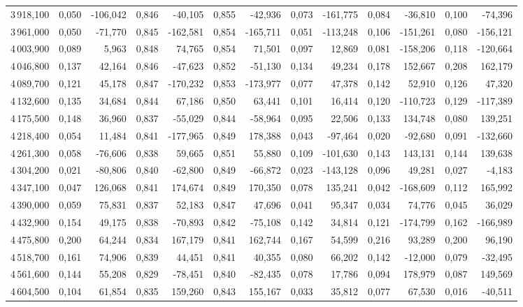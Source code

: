 \begin{longtable}{rrrrrrrrrrrrr}
3\,918,100 & 0,050 & -106,042 & 0,846 & -40,105 & 0,855 & -42,936 & 0,073 & -161,775 & 0,084 & -36,810 & 0,100 & -74,396\\
3\,961,000 & 0,050 & -71,770 & 0,845 & -162,581 & 0,854 & -165,711 & 0,051 & -113,248 & 0,106 & -151,261 & 0,080 & -156,121\\
4\,003,900 & 0,089 & 5,963 & 0,848 & 74,765 & 0,854 & 71,501 & 0,097 & 12,869 & 0,081 & -158,206 & 0,118 & -120,664\\
4\,046,800 & 0,137 & 42,164 & 0,846 & -47,623 & 0,852 & -51,130 & 0,134 & 49,234 & 0,178 & 152,667 & 0,208 & 162,179\\
4\,089,700 & 0,121 & 45,178 & 0,847 & -170,232 & 0,853 & -173,977 & 0,077 & 47,378 & 0,142 & 52,910 & 0,126 & 47,320\\
4\,132,600 & 0,135 & 34,684 & 0,844 & 67,186 & 0,850 & 63,441 & 0,101 & 16,414 & 0,120 & -110,723 & 0,129 & -117,389\\
4\,175,500 & 0,148 & 36,960 & 0,837 & -55,029 & 0,844 & -58,964 & 0,095 & 22,506 & 0,133 & 134,748 & 0,080 & 139,251\\
4\,218,400 & 0,054 & 11,484 & 0,841 & -177,965 & 0,849 & 178,388 & 0,043 & -97,464 & 0,020 & -92,680 & 0,091 & -132,660\\
4\,261,300 & 0,058 & -76,606 & 0,838 & 59,665 & 0,851 & 55,880 & 0,109 & -101,630 & 0,143 & 143,131 & 0,144 & 139,638\\
4\,304,200 & 0,021 & -80,806 & 0,840 & -62,800 & 0,849 & -66,872 & 0,023 & -143,128 & 0,096 & 49,281 & 0,027 & -4,183\\
4\,347,100 & 0,047 & 126,068 & 0,841 & 174,674 & 0,849 & 170,350 & 0,078 & 135,241 & 0,042 & -168,609 & 0,112 & 165,992\\
4\,390,000 & 0,059 & 75,831 & 0,837 & 52,183 & 0,847 & 47,696 & 0,041 & 95,347 & 0,034 & 74,776 & 0,045 & 36,029\\
4\,432,900 & 0,154 & 49,175 & 0,838 & -70,893 & 0,842 & -75,108 & 0,142 & 34,814 & 0,121 & -174,799 & 0,162 & -166,989\\
4\,475,800 & 0,200 & 64,244 & 0,834 & 167,179 & 0,841 & 162,744 & 0,167 & 54,599 & 0,216 & 93,289 & 0,200 & 96,190\\
4\,518,700 & 0,161 & 74,906 & 0,839 & 44,451 & 0,841 & 40,355 & 0,080 & 66,202 & 0,142 & -12,000 & 0,079 & -32,495\\
4\,561,600 & 0,144 & 55,208 & 0,829 & -78,451 & 0,840 & -82,435 & 0,078 & 17,786 & 0,094 & 178,979 & 0,087 & 149,569\\
4\,604,500 & 0,104 & 61,854 & 0,835 & 159,260 & 0,843 & 155,167 & 0,033 & 35,812 & 0,077 & 67,530 & 0,016 & -40,511\\

\end{longtable}
